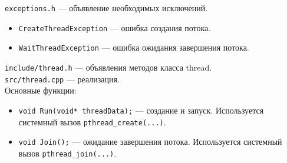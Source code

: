 \texttt{exceptions.h} --- объявление необходимых исключений.
\begin{itemize}
\item \texttt{CreateThreadException} --- ошибка создания потока.
\item \texttt{WaitThreadException} --- ошибка ожидания завершения потока.
\end{itemize}

\texttt{include/thread.h} --- объявления методов класса thread. \\ 
\texttt{src/thread.cpp} --- реализация.\\

Основные функции:
\begin{itemize}
\item \texttt{void Run(void* threadData);} --- создание и запуск. Используется системный вызов \texttt{pthread\_create(...)}.
\item \texttt{void Join();} --- ожидание завершения потока. Используется системный вызов \texttt{pthread\_join(...)}.
\end{itemize}